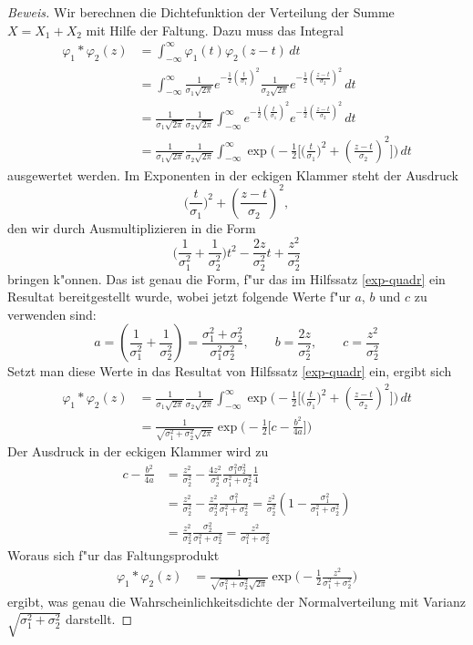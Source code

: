 \begin{proof}[Beweis]
Wir berechnen die Dichtefunktion der Verteilung der Summe $X=X_1+X_2$
mit Hilfe der Faltung. 
Dazu muss das Integral 
\begin{align*}
\varphi_1*\varphi_2(z)
&=
\int_{-\infty}^{\infty}\varphi_1(t)\varphi_2(z-t)\,dt\\
&=
\int_{-\infty}^{\infty}
\frac1{\sigma_1\sqrt{2\pi}}e^{-\frac12\left(\frac{t}{\sigma_1}\right)^2}
\frac1{\sigma_2\sqrt{2\pi}}e^{-\frac12\left(\frac{z-t}{\sigma_2}\right)^2}
\,dt\\
&=
\frac1{\sigma_1\sqrt{2\pi}}
\frac1{\sigma_2\sqrt{2\pi}}
\int_{-\infty}^{\infty}
e^{-\frac12\left(\frac{t}{\sigma_1}\right)^2}
e^{-\frac12\left(\frac{z-t}{\sigma_2}\right)^2}
\,dt\\
&=
\frac1{\sigma_1\sqrt{2\pi}}
\frac1{\sigma_2\sqrt{2\pi}}
\int_{-\infty}^{\infty}
\exp\biggl(-\frac12\biggl[\biggl(\frac{t}{\sigma_1}\biggr)^2
+\left(\frac{z-t}{\sigma_2}\right)^2\biggr]\biggr)
\,dt
\end{align*}
ausgewertet werden. Im Exponenten in der eckigen Klammer steht der Ausdruck
\[
\biggl(\frac{t}{\sigma_1}\biggr)^2 +\left(\frac{z-t}{\sigma_2}\right)^2,
\]
den wir durch Ausmultiplizieren in die Form
\[
\biggl(\frac1{\sigma_1^2}+\frac1{\sigma_2^2}\biggr)t^2
-\frac{2z}{\sigma_2^2}t+\frac{z^2}{\sigma_2^2}
\]
bringen k"onnen. Das ist genau die Form, f"ur das im Hilfssatz \ref{exp-quadr}
ein Resultat bereitgestellt wurde, wobei jetzt folgende Werte f"ur $a$, $b$ und $c$
zu verwenden sind:
\[
a=\left(\frac1{\sigma_1^2}+\frac1{\sigma_2^2}\right)
=\frac{\sigma_1^2+\sigma_2^2}{\sigma_1^2\sigma_2^2},\qquad
b=\frac{2z}{\sigma_2^2},\qquad
c=\frac{z^2}{\sigma_2^2}
\]
Setzt man diese Werte in das Resultat von Hilfssatz \ref{exp-quadr} ein,
ergibt sich
\begin{align*}
\varphi_1*\varphi_2(z)
&=
\frac1{\sigma_1\sqrt{2\pi}}
\frac1{\sigma_2\sqrt{2\pi}}
\int_{-\infty}^{\infty}
\exp\biggl(-\frac12\biggl[\biggl(\frac{t}{\sigma_1}\biggr)^2
+\left(\frac{z-t}{\sigma_2}\right)^2\biggr]\biggr)
\,dt\\
&=
\frac1{\sqrt{\sigma_1^2+\sigma_2^2}\sqrt{2\pi}}
\exp\biggl(-\frac12\biggl[c-\frac{b^2}{4a} \biggr]\biggr)
\end{align*}
Der Ausdruck in der eckigen Klammer wird zu
\begin{align*}
c-\frac{b^2}{4a}
&=
\frac{z^2}{\sigma_2^2}
-
\frac{4z^2}{\sigma_2^4}
\frac{\sigma_1^2\sigma_2^2}{\sigma_1^2+\sigma_2^2}
\frac14\\
&=
\frac{z^2}{\sigma_2^2}
-
\frac{z^2}{\sigma_2^2}
\frac{\sigma_1^2}{\sigma_1^2+\sigma_2^2}
=
\frac{z^2}{\sigma_2^2}
\left(
1-\frac{\sigma_1^2}{\sigma_1^2+\sigma_2^2}
\right)\\
&=
\frac{z^2}{\sigma_2^2}
\frac{\sigma_2^2}{\sigma_1^2+\sigma_2^2}
=
\frac{z^2}
{\sigma_1^2+\sigma_2^2}
\end{align*}
Woraus sich f"ur das Faltungsprodukt
\begin{align*}
\varphi_1*\varphi_2(z)
&=
\frac1{\sqrt{\sigma_1^2+\sigma_2^2}\sqrt{2\pi}}
\exp\biggl(-\frac12\frac{z^2}{\sigma_1^2+\sigma_2^2}\biggr)
\end{align*}
ergibt, was genau die Wahrscheinlichkeitsdichte der Normalverteilung
mit Varianz $\sqrt{\sigma_1^2+\sigma_2^2}$ darstellt.
\end{proof}

